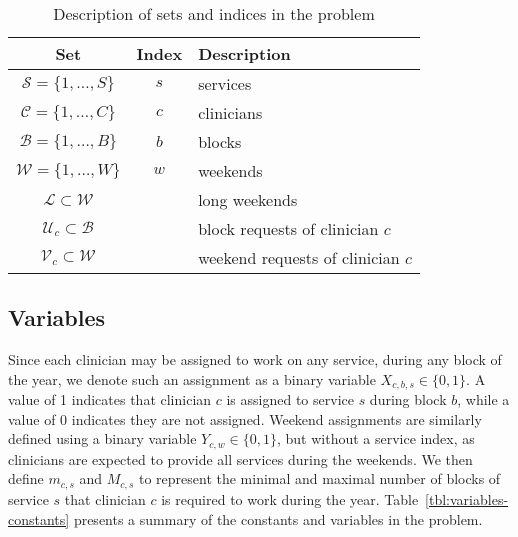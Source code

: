 \begin{table}[h]
	\centering
  \caption{Description of sets and indices in the problem}%
  \label{tbl:sets-indices}
	\begin{tabular}{ c c l }
		\toprule
		\textbf{Set}                         & \textbf{Index} & \textbf{Description}  
		\\ \midrule
		$\mathcal{S} = \{1, \ldots, S \}$    & $s$            & services              
		\\
		$\mathcal{C} = \{1, \ldots, C \}$    & $c$            & clinicians            
		\\
		$\mathcal{B} = \{1, \ldots, B \}$    & $b$            & blocks                
		\\
		$\mathcal{W} = \{1, \ldots, W \}$    & $w$            & weekends              
		\\
		$\mathcal{L} \subset \mathcal{W}$    &                & long weekends         
		\\
		$\mathcal{U}_c \subset \mathcal{B}$ &                & block requests of
		clinician $c$   \\
		$\mathcal{V}_c \subset \mathcal{W}$ &                & weekend requests of
		clinician $c$ \\
    \bottomrule
	\end{tabular}
	
\end{table}

\subsection{Variables}\label{sec:meth-variables}
Since each clinician may be assigned to work on any service, during any block of
the year, we denote such an assignment as a binary variable $X_{c, b, s} \in \{0,1\}$.
A value of 1 indicates that clinician $c$ is assigned to service $s$ during block $b$,
while a value of 0 indicates they are not assigned.
Weekend assignments are similarly defined using a binary
variable $Y_{c, w} \in \{0,1\}$, but without a service index, as clinicians are expected to
provide all services during the weekends. We then define
$m_{c, s}$ and $M_{c, s}$ to represent the minimal and maximal number of blocks of service $s$
that clinician $c$ is required to work during the year.
Table~\ref{tbl:variables-constants} presents a summary of the constants and variables
in the problem.

